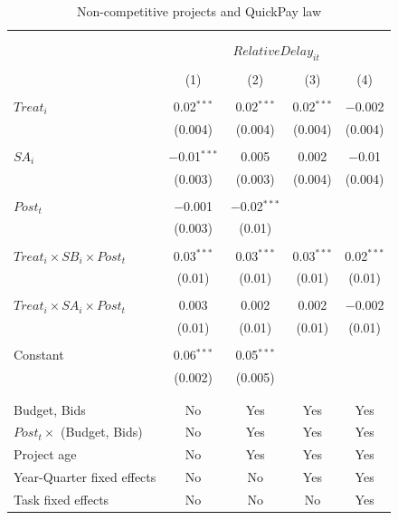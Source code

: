 \documentclass[
]{article}
\begin{document}
\begin{table}[H] \centering 
  \caption{Non-competitive projects and QuickPay law} 
  \label{} 
\small 
\begin{tabular}{@{\extracolsep{-2pt}}lcccc} 
\\[-1.8ex]\hline 
\hline \\[-1.8ex] 
\\[-1.8ex] & \multicolumn{4}{c}{$RelativeDelay_{it}$} \\ 
\\[-1.8ex] & (1) & (2) & (3) & (4)\\ 
\hline \\[-1.8ex] 
 $Treat_i$ & 0.02$^{***}$ & 0.02$^{***}$ & 0.02$^{***}$ & $-$0.002 \\ 
  & (0.004) & (0.004) & (0.004) & (0.004) \\ 
  & & & & \\ 
 $SA_i$ & $-$0.01$^{***}$ & 0.005 & 0.002 & $-$0.01 \\ 
  & (0.003) & (0.003) & (0.004) & (0.004) \\ 
  & & & & \\ 
 $Post_t$ & $-$0.001 & $-$0.02$^{***}$ &  &  \\ 
  & (0.003) & (0.01) &  &  \\ 
  & & & & \\ 
 $Treat_i \times SB_i \times Post_t$ & 0.03$^{***}$ & 0.03$^{***}$ & 0.03$^{***}$ & 0.02$^{***}$ \\ 
  & (0.01) & (0.01) & (0.01) & (0.01) \\ 
  & & & & \\ 
 $Treat_i \times SA_i \times Post_t$ & 0.003 & 0.002 & 0.002 & $-$0.002 \\ 
  & (0.01) & (0.01) & (0.01) & (0.01) \\ 
  & & & & \\ 
 Constant & 0.06$^{***}$ & 0.05$^{***}$ &  &  \\ 
  & (0.002) & (0.005) &  &  \\ 
  & & & & \\ 
\hline \\[-1.8ex] 
Budget, Bids & No & Yes & Yes & Yes \\ 
$Post_t \times $  (Budget, Bids) & No & Yes & Yes & Yes \\ 
Project age & No & Yes & Yes & Yes \\ 
Year-Quarter fixed effects & No & No & Yes & Yes \\ 
Task fixed effects & No & No & No & Yes \\ 

\end{tabular}
\end{table}
\end{document}
